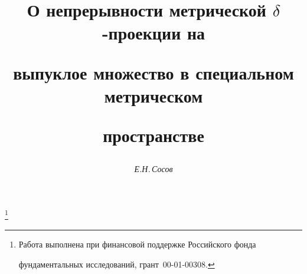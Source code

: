 




%


\newcommand{\tts}[1]{}







\setcounter{page}{71}















\author{\it Е.Н.\,Сосов}




\title{О непрерывности метрической $\delta$-проекции на 


выпуклое множество в специальном метрическом


пространстве}


\thanks{Работа выполнена при финансовой поддержке Российского фонда


фундаментальных исследований, грант \No\,00-01-00308.}





\date{}




\pagestyle{plain} %







\maketitle


